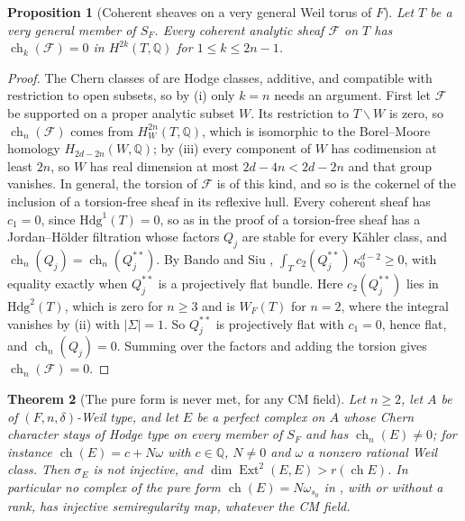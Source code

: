 \documentclass[11pt,reqno]{amsart}
\theoremstyle{plain}
\newtheorem{theorem}{Theorem}[section]
\newtheorem{proposition}[theorem]{Proposition}
\theoremstyle{definition}
\theoremstyle{remark}
\newcommand{\QQ}{\mathbb{Q}}
\newcommand{\Hdg}{\mathrm{Hdg}}
\DeclareMathOperator{\ch}{ch}
\DeclareMathOperator{\Ext}{Ext}
\begin{document}
\begin{proposition}[Coherent sheaves on a very general Weil torus of $F$]
\label{prop:cmweiltorussheaves}
Let $T$ be a very general member of $S_{F}$. Every coherent analytic sheaf
$\mathcal{F}$ on $T$ has $\ch_{k}(\mathcal{F})=0$ in $H^{2k}(T,\QQ)$ for
$1\le k\le2n-1$.
\end{proposition}

\begin{proof}
The Chern classes of \cite{Gri10} are Hodge classes, additive, and
compatible with restriction to open subsets, so by
(i) only $k=n$ needs an argument. First let
$\mathcal{F}$ be supported on a proper analytic subset $W$. Its restriction to
$T\smallsetminus W$ is zero, so $\ch_{n}(\mathcal{F})$ comes from
$H^{2n}_{W}(T,\QQ)$, which is isomorphic to the Borel--Moore homology
$H_{2d-2n}(W,\QQ)$; by (iii) every component of $W$ has
codimension at least $2n$, so $W$ has real dimension at most $2d-4n<2d-2n$
and that group vanishes. In general, the torsion of $\mathcal{F}$ is of this
kind, and so is the cokernel of the inclusion of a torsion-free sheaf in its
reflexive hull. Every coherent sheaf has $c_{1}=0$, since $\Hdg^{1}(T)=0$, so
as in the proof of  a torsion-free sheaf has a
Jordan--H\"older filtration whose factors $Q_{j}$ are stable for every
K\"ahler class, and $\ch_{n}(Q_{j})=\ch_{n}(Q_{j}^{**})$. By Bando and Siu
\cite{BS94}, $\int_{T}c_{2}(Q_{j}^{**})\,\kappa_{0}^{d-2}\ge0$, with equality
exactly when $Q_{j}^{**}$ is a projectively flat bundle. Here
$c_{2}(Q_{j}^{**})$ lies in $\Hdg^{2}(T)$, which is zero for $n\ge3$ and is
$W_{F}(T)$ for $n=2$, where the integral vanishes by
(ii) with $|\Sigma|=1$. So $Q_{j}^{**}$ is projectively
flat with $c_{1}=0$, hence flat, and $\ch_{n}(Q_{j})=0$. Summing over the
factors and adding the torsion gives $\ch_{n}(\mathcal{F})=0$.
\end{proof}

\begin{theorem}[The pure form is never met, for any CM field]
\label{thm:cmpurefalse}
Let $n\ge2$, let $A$ be of $(F,n,\delta)$-Weil type, and let $E$ be a
perfect complex on $A$ whose Chern character stays of Hodge type on every
member of $S_{F}$ and has $\ch_{n}(E)\ne0$; for instance
$\ch(E)=c+N\omega$ with $c\in\QQ$, $N\ne0$ and $\omega$ a nonzero rational
Weil class. Then $\sigma_{E}$ is not injective, and
$\dim\Ext^{2}(E,E)>r(\ch E)$. In particular no complex of the pure form
$\ch(E)=N\omega_{s_{0}}$ in \cite[Theorem~17.7(v)]{paperI}, with or without a
rank, has injective semiregularity map, whatever the CM field.
\end{theorem}
\end{document}
